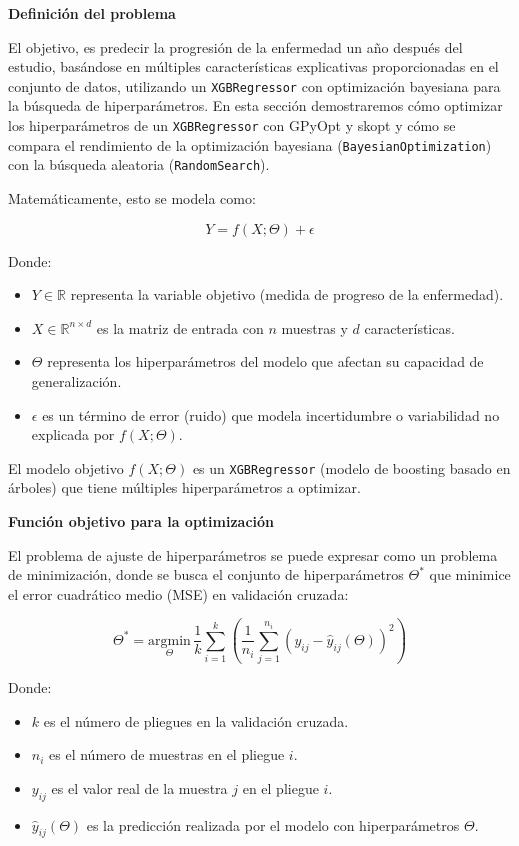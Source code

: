 \documentclass[
  12pt,
  letterpaper,
  DIV=11,
  numbers=noendperiod]{scrartcl}
\begin{document}
\textbf{Definición del problema}

El objetivo, es predecir la progresión de la enfermedad un año después
del estudio, basándose en múltiples características explicativas
proporcionadas en el conjunto de datos, utilizando un
\texttt{XGBRegressor} con optimización bayesiana para la búsqueda de
hiperparámetros. En esta sección demostraremos cómo optimizar los
hiperparámetros de un \texttt{XGBRegressor} con GPyOpt y skopt y cómo se
compara el rendimiento de la optimización bayesiana
(\texttt{BayesianOptimization}) con la búsqueda aleatoria
(\texttt{RandomSearch}).

Matemáticamente, esto se modela como:

\[
Y = f(X; \Theta) + \epsilon
\]

Donde:

\begin{itemize}
\item
  \(Y \in \mathbb{R}\) representa la variable objetivo (medida de
  progreso de la enfermedad).
\item
  \(X \in \mathbb{R}^{n \times d}\) es la matriz de entrada con \(n\)
  muestras y \(d\) características.
\item
  \(\Theta\) representa los hiperparámetros del modelo que afectan su
  capacidad de generalización.
\item
  \(\epsilon\) es un término de error (ruido) que modela incertidumbre o
  variabilidad no explicada por \(f(X; \Theta)\).
\end{itemize}

El modelo objetivo \(f(X; \Theta)\) es un \texttt{XGBRegressor} (modelo
de boosting basado en árboles) que tiene múltiples hiperparámetros a
optimizar.

\textbf{Función objetivo para la optimización}

El problema de ajuste de hiperparámetros se puede expresar como un
problema de minimización, donde se busca el conjunto de hiperparámetros
\(\Theta^*\) que minimice el error cuadrático medio (MSE) en validación
cruzada:

\[
\Theta^* = \underset{\Theta}{\text{argmin}} \, \frac{1}{k} \sum_{i=1}^{k} \left( \frac{1}{n_i} \sum_{j=1}^{n_i} \left( y_{ij} - \hat{y}_{ij}(\Theta) \right)^2 \right)
\]

Donde:

\begin{itemize}
\item
  \(k\) es el número de pliegues en la validación cruzada.
\item
  \(n_i\) es el número de muestras en el pliegue \(i\).
\item
  \(y_{ij}\) es el valor real de la muestra \(j\) en el pliegue \(i\).
\item
  \(\hat{y}_{ij}(\Theta)\) es la predicción realizada por el modelo con
  hiperparámetros \(\Theta\).
\end{itemize}
\end{document}

